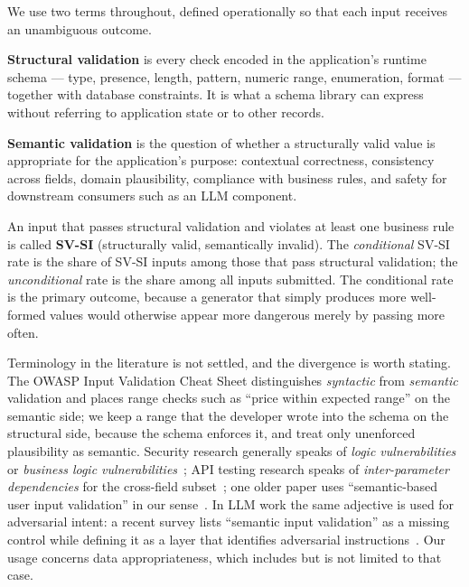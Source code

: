 \documentclass[conference]{IEEEtran}
\begin{document}
We use two terms throughout, defined operationally so that each input receives an unambiguous
outcome.

\textbf{Structural validation} is every check encoded in the application's runtime schema --- type,
presence, length, pattern, numeric range, enumeration, format --- together with database
constraints. It is what a schema library can express without referring to application state or to
other records.

\textbf{Semantic validation} is the question of whether a structurally valid value is appropriate for
the application's purpose: contextual correctness, consistency across fields, domain plausibility,
compliance with business rules, and safety for downstream consumers such as an LLM component.

An input that passes structural validation and violates at least one business rule is called
\textbf{SV-SI} (structurally valid, semantically invalid). The \emph{conditional} SV-SI rate is the
share of SV-SI inputs among those that pass structural validation; the \emph{unconditional} rate is
the share among all inputs submitted. The conditional rate is the primary outcome, because a
generator that simply produces more well-formed values would otherwise appear more dangerous merely
by passing more often.

Terminology in the literature is not settled, and the divergence is worth stating. The OWASP Input
Validation Cheat Sheet distinguishes \emph{syntactic} from \emph{semantic} validation and places
range checks such as ``price within expected range'' on the semantic side; we keep a range that the
developer wrote into the schema on the structural side, because the schema enforces it, and treat
only unenforced plausibility as semantic. Security research generally speaks of \emph{logic
vulnerabilities}~\cite{felmetsger2010waler,pellegrino2014logicflaws} or \emph{business logic
vulnerabilities}~\cite{metin2025blv}; API testing research speaks of \emph{inter-parameter
dependencies} for the cross-field subset~\cite{martinlopez2022idl,martinlopez2019catalogue}; one
older paper uses ``semantic-based user input validation'' in our
sense~\cite{hanna2018semanticvalidation}. In LLM work the same adjective is used for adversarial
intent: a recent survey lists ``semantic input validation'' as a missing control while defining it as
a layer that identifies adversarial instructions~\cite{singh2026injectioninteraction}. Our usage
concerns data appropriateness, which includes but is not limited to that case.
\end{document}
